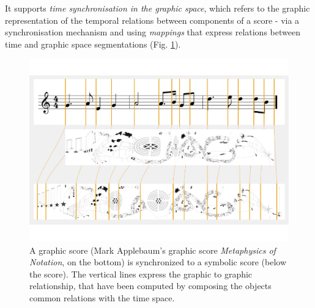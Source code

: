 \documentclass[11pt,a4paper]{article}
\begin{document}
It supports \emph{time synchronisation in the graphic space}, which refers to the graphic representation of the temporal relations between components of a score - via a synchronisation mechanism and using \emph{mappings} that express relations between time and graphic space segmentations (Fig. \ref{fig:sync}).
\begin{figure}[ht]
\begin{center}
	\includegraphics[width=1.\columnwidth]{imgs/syncAB}
\caption{A graphic score (Mark Applebaum's graphic score \emph{Metaphysics of Notation}, on the bottom) is synchronized to a symbolic score (below the score). The vertical lines express the graphic to graphic relationship, that have been computed by composing the objects common relations with the time space.}
\label{fig:sync}
\end{center}
\end{figure}
\end{document}
